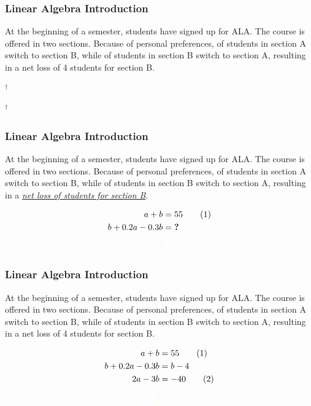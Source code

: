 \documentclass[12pt]{beamer}
\newcommand{\FrameTitle}[2]{\frametitle{#1 \hfill \small\textnormal{\textcolor{midgray}{#2}}}}
\newcommand{\vsp}{\vspace*{1em}}
\begin{document}
\begin{frame}\FrameTitle{Linear Algebra}{Introduction}
    At the beginning of a semester, {\color{blue!20}{55}} students have signed up for ALA.
    The course is offered in two sections. Because of personal preferences,
    {\color{blue!20}{20\%}} of students in section A switch to section B, while {\color{blue!20}{30\%}} of
    students in section B switch to section A, resulting in a net loss
    of 4 students for section B.

    \vsp
    {\color{question}{How large are the two sections at the beginning of the semester?}}$^\dagger$

    \vfill
    $^\dagger${}
\end{frame}

\begin{frame}\FrameTitle{Linear Algebra}{Introduction}
    At the beginning of a semester, {\color{blue!20}{55}} students have signed up for ALA.
    The course is offered in two sections. Because of personal preferences,
    {\color{blue!20}{20\%}} of students in section A switch to section B, while {\color{blue!20}{30\%}} of
    students in section B switch to section A, resulting in a {\emph{\uline{net loss
    of {\color{blue!20}{4}} students for section B}}}.

    \vsp
    {\color{question}{How large are the two sections at the beginning of the semester?}}
    \begin{align*}
        a + b & = 55 \tag{1}\\
        b + 0.2a - 0.3b & = \textbf{?} \notag \\
        {\color{yellow}{\vdots}}
    \end{align*}
\end{frame}

\begin{frame}\FrameTitle{Linear Algebra}{Introduction}
    At the beginning of a semester, {\color{blue!20}{55}} students have signed up for ALA.
    The course is offered in two sections. Because of personal preferences,
    {\color{blue!20}{20\%}} of students in section A switch to section B, while {\color{blue!20}{30\%}} of
    students in section B switch to section A, resulting in a net loss
    of 4 students for section B.

    \vsp
    {\color{question}{How large are the two sections at the beginning of the semester?}}
    \begin{align*}
        a + b & = 55 \tag{1}\\
        b + 0.2a - 0.3b & = b-4 \notag \\
        2a - 3b & = -40 \tag{2}\\
        {\color{yellow}{\vdots}}
    \end{align*}
\end{frame}
\end{document}
